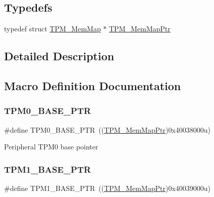 \subsection*{Typedefs}
\begin{DoxyCompactItemize}
\item 
typedef struct \hyperlink{struct_t_p_m___mem_map}{T\+P\+M\+\_\+\+Mem\+Map} $\ast$ \hyperlink{group___t_p_m___peripheral_ga32147338cedc9904efff0d19b3a358ac}{T\+P\+M\+\_\+\+Mem\+Map\+Ptr}
\end{DoxyCompactItemize}


\subsection{Detailed Description}


\subsection{Macro Definition Documentation}
\mbox{\label{group___t_p_m___peripheral_ga8ba6c6fb69345639750108c3289a24c4}} 
\subsubsection{\texorpdfstring{T\+P\+M0\+\_\+\+B\+A\+S\+E\+\_\+\+P\+TR}{TPM0\_BASE\_PTR}}
{\footnotesize\ttfamily \#define T\+P\+M0\+\_\+\+B\+A\+S\+E\+\_\+\+P\+TR~((\hyperlink{group___t_p_m___peripheral_ga32147338cedc9904efff0d19b3a358ac}{T\+P\+M\+\_\+\+Mem\+Map\+Ptr})0x40038000u)}

Peripheral T\+P\+M0 base pointer \mbox{\label{group___t_p_m___peripheral_ga3c3f533f8c87c74f2bbc3a4de83d1181}} 
\subsubsection{\texorpdfstring{T\+P\+M1\+\_\+\+B\+A\+S\+E\+\_\+\+P\+TR}{TPM1\_BASE\_PTR}}
{\footnotesize\ttfamily \#define T\+P\+M1\+\_\+\+B\+A\+S\+E\+\_\+\+P\+TR~((\hyperlink{group___t_p_m___peripheral_ga32147338cedc9904efff0d19b3a358ac}{T\+P\+M\+\_\+\+Mem\+Map\+Ptr})0x40039000u)}

